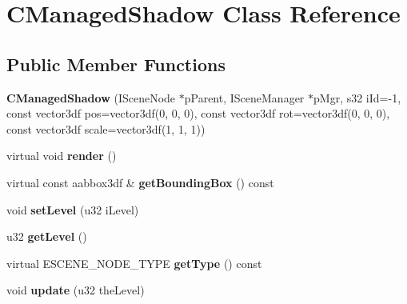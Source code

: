 \hypertarget{class_c_managed_shadow}{
\section{CManagedShadow Class Reference}
\label{class_c_managed_shadow}
}
\subsection*{Public Member Functions}
\begin{DoxyCompactItemize}
\item 
\hypertarget{class_c_managed_shadow_a36f16423f666a706a98b5aa81e92c802}{
{\bfseries CManagedShadow} (ISceneNode $\ast$pParent, ISceneManager $\ast$pMgr, s32 iId=-\/1, const vector3df pos=vector3df(0, 0, 0), const vector3df rot=vector3df(0, 0, 0), const vector3df scale=vector3df(1, 1, 1))}
\label{class_c_managed_shadow_a36f16423f666a706a98b5aa81e92c802}

\item 
\hypertarget{class_c_managed_shadow_aa88d65bf3c36db4cc8043d6e11dfd075}{
virtual void {\bfseries render} ()}
\label{class_c_managed_shadow_aa88d65bf3c36db4cc8043d6e11dfd075}

\item 
\hypertarget{class_c_managed_shadow_ac43c25256a08d66d3d2193bd59440ead}{
virtual const aabbox3df \& {\bfseries getBoundingBox} () const }
\label{class_c_managed_shadow_ac43c25256a08d66d3d2193bd59440ead}

\item 
\hypertarget{class_c_managed_shadow_abcfaa0eff51beec8c9d91591e13222ed}{
void {\bfseries setLevel} (u32 iLevel)}
\label{class_c_managed_shadow_abcfaa0eff51beec8c9d91591e13222ed}

\item 
\hypertarget{class_c_managed_shadow_ad935b5bc2e8ccceed95ff1a3d542625d}{
u32 {\bfseries getLevel} ()}
\label{class_c_managed_shadow_ad935b5bc2e8ccceed95ff1a3d542625d}

\item 
\hypertarget{class_c_managed_shadow_a001afaec9eaa7ce634985379b425675e}{
virtual ESCENE\_\-NODE\_\-TYPE {\bfseries getType} () const }
\label{class_c_managed_shadow_a001afaec9eaa7ce634985379b425675e}

\item 
\hypertarget{class_c_managed_shadow_a97ede497c1f7c63b43e965a6700ef28a}{
void {\bfseries update} (u32 theLevel)}
\label{class_c_managed_shadow_a97ede497c1f7c63b43e965a6700ef28a}


\end{DoxyCompactItemize}

